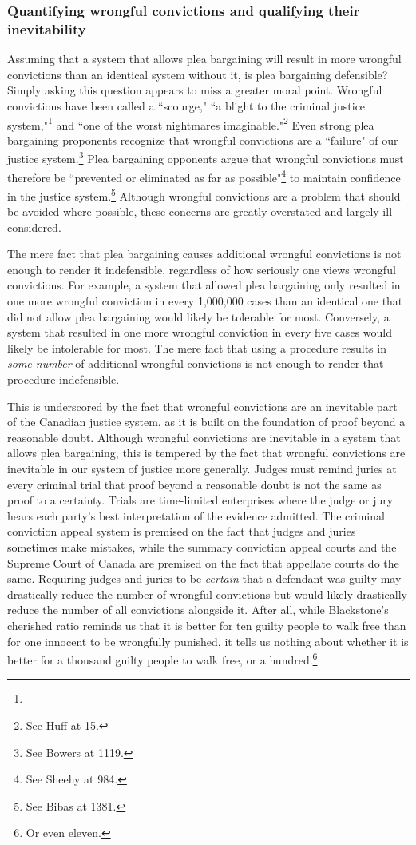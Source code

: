 \subsubsection{Quantifying wrongful convictions and qualifying their inevitability}

Assuming that a system that allows plea bargaining will result in more wrongful convictions than an identical system without it, is plea bargaining defensible? Simply asking this question appears to miss a greater moral point. Wrongful convictions have been called a ``scourge," ``a blight to the criminal justice system,"\footnote{} and ``one of the worst nightmares imaginable."\footnote{See Huff at 15.} Even strong plea bargaining proponents recognize that wrongful convictions are a ``failure" of our justice system.\footnote{See Bowers at 1119.} Plea bargaining opponents argue that wrongful convictions must therefore be ``prevented or eliminated as far as possible"\footnote{See Sheehy at 984.} to maintain confidence in the justice system.\footnote{See Bibas at 1381.} Although wrongful convictions are a problem that should be avoided where possible, these concerns are greatly overstated and largely ill-considered.

The mere fact that plea bargaining causes additional wrongful convictions is not enough to render it indefensible, regardless of how seriously one views wrongful convictions. For example, a system that allowed plea bargaining only resulted in one more wrongful conviction in every 1,000,000 cases than an identical one that did not allow plea bargaining would likely be tolerable for most. Conversely, a system that resulted in one more wrongful conviction in every five cases would likely be intolerable for most. The mere fact that using a procedure results in \textit{some number} of additional wrongful convictions is not enough to render that procedure indefensible. 

This is underscored by the fact that wrongful convictions are an inevitable part of the Canadian justice system, as it is built on the foundation of proof beyond a reasonable doubt. Although wrongful convictions are inevitable in a system that allows plea bargaining, this is tempered by the fact that wrongful convictions are inevitable in our system of justice more generally. Judges must remind juries at every criminal trial that proof beyond a reasonable doubt is not the same as proof to a certainty. Trials are time-limited enterprises where the judge or jury hears each party's best interpretation of the evidence admitted. The criminal conviction appeal system is premised on the fact that judges and juries sometimes make mistakes, while the summary conviction appeal courts and the Supreme Court of Canada are premised on the fact that appellate courts do the same. Requiring judges and juries to be \textit{certain} that a defendant was guilty may drastically reduce the number of wrongful convictions but would likely drastically reduce the number of all convictions alongside it. After all, while Blackstone's cherished ratio reminds us that it is better for ten guilty people to walk free than for one innocent to be wrongfully punished, it tells us nothing about whether it is better for a thousand guilty people to walk free, or a hundred.\footnote{Or even eleven.}

